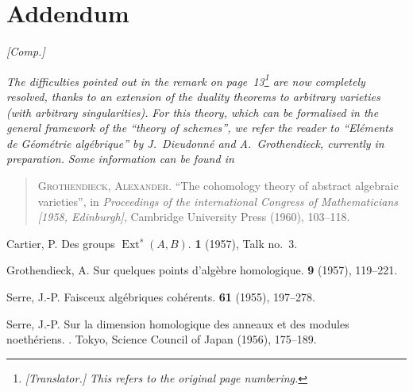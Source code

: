 \documentclass{article}
\DeclareMathOperator{\Ext}{Ext}
\begin{document}
\section*{Addendum}
\label{addendum}

\emph{[Comp.]}

\emph{The difficulties pointed out in the remark on page~13\footnote{\emph{[Translator.] This refers to the original page numbering.}} are now completely resolved, thanks to an extension of the duality theorems to arbitrary varieties (with arbitrary singularities).}
\emph{For this theory, which can be formalised in the general framework of the ``theory of schemes'', we refer the reader to ``El\'{e}ments de G\'{e}om\'{e}trie alg\'{e}brique'' by J.~Dieudonn\'{e} and A.~Grothendieck, currently in preparation.}
\emph{Some information can be found in}

\begin{quote}
  \textsc{Grothendieck, Alexander.} ``The cohomology theory of abstract algebraic varieties'', in \emph{Proceedings of the international Congress of Mathematicians [1958, Edinburgh]}, Cambridge University Press (1960), 103--118.
\end{quote}

\noindent[April, 1959]



\nocite{*}
% 
\begin{thebibliography}{4}

  {Cartier, P.}
  \newblock Des groups $\Ext^s(A,B)$.
   \textbf{1} (1957), Talk no.~3.

  {Grothendieck, A.}
  \newblock Sur quelques points d'alg\`{e}bre homologique.
   {\bf 9} (1957), 119--221.

  {Serre, J.-P.}
  \newblock Faisceux alg\'{e}briques coh\'{e}rents.
   {\bf 61} (1955), 197--278.

  {Serre, J.-P.}
  \newblock Sur la dimension homologique des anneaux et des modules noeth\'{e}riens.
  .
  \newblock Tokyo, Science Council of Japan (1956), 175--189.

\end{thebibliography}
\end{document}
